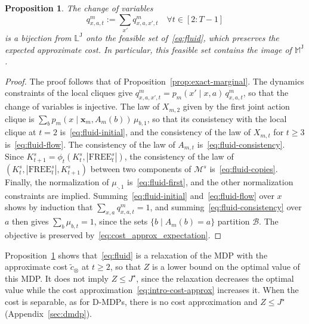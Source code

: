 \documentclass{article}
\newtheorem{proposition}{Proposition}
\begin{document}
\begin{proposition}
\label{prop:fluid-relaxation}
The change of variables
\begin{equation}
\label{eq:fluid-change}
q^m_{x,a,t} := \sum_{x'} q^m_{x,a,x',t} \quad \forall t \in [2:T-1]
\end{equation}
is a bijection from $\mathbb{L}^{\mathrm{J}}$ onto the feasible set of~\eqref{eq:fluid}, which preserves the expected
approximate cost. In particular, this feasible set contains the image of $\mathbb{M}^{\mathrm{J}}$.
\end{proposition}

\begin{proof}
The proof follows that of Proposition~\ref{prop:exact-marginal}. The dynamics constraints of the local cliques give
$q^m_{x,a,x',t} = p_m(x' \mid x, a)\, q^m_{x,a,t}$, so that the change of variables is injective. The law of $X_{m,2}$
given by the first joint action clique is $\sum_b p_m(x \mid \mathbf{x}_m, A_m(b))\, \mu_{b,1}$, so that its
consistency with the local clique at $t = 2$ is~\eqref{eq:fluid-initial}, and the consistency of the law of $X_{m,t}$
for $t \ge 3$ is~\eqref{eq:fluid-flow}. The consistency of the law of $A_{m,t}$ is~\eqref{eq:fluid-consistency}. Since
$K^s_{t+1} = \phi_t(K^s_t, |\text{FREE}^s_t|)$, the consistency of the law of $(K^s_t, |\text{FREE}^s_t|, K^s_{t+1})$
between two components of $\mathcal{M}^s$ is~\eqref{eq:fluid-copies}. Finally, the normalization of $\mu_{\cdot,1}$
is~\eqref{eq:fluid-first}, and the other normalization constraints are implied. Summing~\eqref{eq:fluid-initial}
and~\eqref{eq:fluid-flow} over $x$ shows by induction that $\sum_{x,a} q^m_{x,a,t} = 1$, and
summing~\eqref{eq:fluid-consistency} over $a$ then gives $\sum_{b} \mu_{b,t} = 1$, since the sets $\{b \mid A_m(b) =
a\}$ partition $\mathcal{B}$. The objective is preserved by~\eqref{eq:cost_approx_expectation}.
\end{proof}

Proposition~\ref{prop:fluid-relaxation} shows that~\eqref{eq:fluid} is a relaxation of the MDP with the approximate
cost $\tilde c_\otimes$ at $t \ge 2$, so that $Z$ is a lower bound on the optimal value of this MDP. It does not imply
$Z \le J^\star$, since the relaxation decreases the optimal value while the cost approximation~\eqref{eq:intro-cost-approx}
increases it. When the cost is separable, as for D-MDPs, there is no cost approximation and $Z \le J^\star$
(Appendix~\ref{sec:dmdp}).
\end{document}
